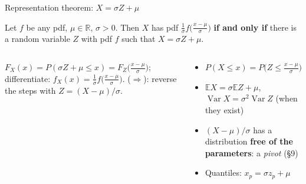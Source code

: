 \documentclass[aspectratio=169,t,10pt]{beamer}
\newcommand{\R}{\mathbb{R}}
\newcommand{\E}{\mathbb{E}}
\newcommand{\Var}{\operatorname{Var}}
\begin{document}
\begin{frame}{Representation theorem: $X=\sigma Z+\mu$}
  \begin{tcolorbox}[mythm={Theorem (CB 3.5.6)}]\small
  Let $f$ be any pdf, $\mu\in\R$, $\sigma>0$. Then $X$ has pdf $\frac1\sigma f\bigl(\frac{x-\mu}\sigma\bigr)$ \textbf{if and only if} there is a random variable $Z$ with pdf $f$ such that $X=\sigma Z+\mu$.
  \end{tcolorbox}
  \begin{columns}[T]
  \begin{tcolorbox}[mynote={Proof ($\Leftarrow$)}]\small
  $F_X(x)=P(\sigma Z+\mu\le x)=F_Z\bigl(\frac{x-\mu}\sigma\bigr)$; differentiate: $f_X(x)=\frac1\sigma f\bigl(\frac{x-\mu}\sigma\bigr)$. ($\Rightarrow$): reverse the steps with $Z=(X-\mu)/\sigma$.
  \end{tcolorbox}
  \begin{tcolorbox}[mydef={Consequences}]\small
  \begin{itemize}
    \item $P(X\le x)=P\bigl(Z\le\frac{x-\mu}\sigma\bigr)$
    \item $\E X=\sigma\E Z+\mu$, $\Var X=\sigma^2\Var Z$ (when they exist)
    \item $(X-\mu)/\sigma$ has a distribution \textbf{free of the parameters}: a \emph{pivot} (\S9)
    \item Quantiles: $x_p=\sigma z_p+\mu$
  \end{itemize}
  \end{tcolorbox}
  \end{columns}
\end{frame}
\end{document}
